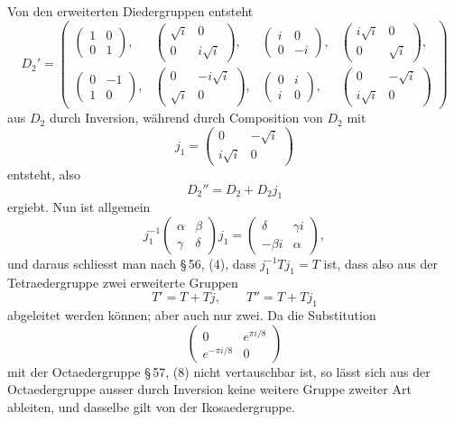 \documentclass[11pt]{article}
\begin{document}
Von den erweiterten Diedergruppen entsteht
\[
D_2'=\left(
\begin{array}{cccc}
\begin{pmatrix}1&0\\0&1\end{pmatrix},&
\begin{pmatrix}\sqrt i&0\\0&i\sqrt i\end{pmatrix},&
\begin{pmatrix}i&0\\0&-i\end{pmatrix},&
\begin{pmatrix}i\sqrt i&0\\0&\sqrt i\end{pmatrix},\\[0.4em]
\begin{pmatrix}0&-1\\1&0\end{pmatrix},&
\begin{pmatrix}0&-i\sqrt i\\\sqrt i&0\end{pmatrix},&
\begin{pmatrix}0&i\\i&0\end{pmatrix},&
\begin{pmatrix}0&-\sqrt i\\i\sqrt i&0\end{pmatrix}
\end{array}
\right)
\]
aus $D_2$ durch Inversion, während durch Composition von $D_2$ mit
\[
 j_1=\begin{pmatrix}0&-\sqrt i\\ i\sqrt i&0\end{pmatrix}
\]
entsteht, also
\[
D_2''=D_2+D_2j_1
\]
ergiebt. Nun ist allgemein
\[
 j_1^{-1}\begin{pmatrix}\alpha&\beta\\ \gamma&\delta\end{pmatrix}j_1
 =
 \begin{pmatrix}\delta&\gamma i\\ -\beta i&\alpha\end{pmatrix},
\]
und daraus schliesst man nach \S\,56, (4), dass $j_1^{-1}Tj_1=T$ ist, dass also aus der Tetraedergruppe zwei erweiterte Gruppen
\[
T'=T+Tj,\qquad T''=T+Tj_1
\]
abgeleitet werden können; aber auch nur zwei. Da die Substitution
\[
\begin{pmatrix}0&e^{\pi i/8}\\e^{-\pi i/8}&0\end{pmatrix}
\]
mit der Octaedergruppe \S\,57, (8) nicht vertauschbar ist, so lässt sich aus der Octaedergruppe ausser durch Inversion keine weitere Gruppe zweiter Art ableiten, und dasselbe gilt von der Ikosaedergruppe.
\end{document}
